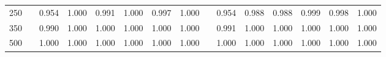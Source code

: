 % 
\begin{tabular}{ccccccccccccccc}
  \hline
  \hline
250 &  & 0.954 & 1.000 & 0.991 & 1.000 & 0.997 & 1.000 &  & 0.954 & 0.988 & 0.988 & 0.999 & 0.998 & 1.000 \\ 
  350 &  & 0.990 & 1.000 & 1.000 & 1.000 & 1.000 & 1.000 &  & 0.991 & 1.000 & 1.000 & 1.000 & 1.000 & 1.000 \\ 
  500 &  & 1.000 & 1.000 & 1.000 & 1.000 & 1.000 & 1.000 &  & 1.000 & 1.000 & 1.000 & 1.000 & 1.000 & 1.000 \\ 
   \hline
\end{tabular}
